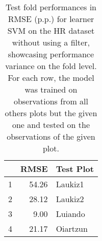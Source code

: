 \begin{table}[ht!]
\centering
\caption{Test fold performances in RMSE (p.p.) for learner SVM on the HR dataset without using a filter, showcasing performance variance on the fold level. For each row, the model was trained on observations from all others plots but the given one and tested on the observations of the given plot.} 
\label{tab:svm-single-fold-perf}
\begin{tabular}{rrl}
  \hline
 & RMSE & Test Plot \\ 
  \hline
1 & 54.26 & Laukiz1 \\ 
  2 & 28.12 & Laukiz2 \\ 
  3 & 9.00 & Luiando \\ 
  4 & 21.17 & Oiartzun \\ 
   \hline
\end{tabular}
\end{table}
